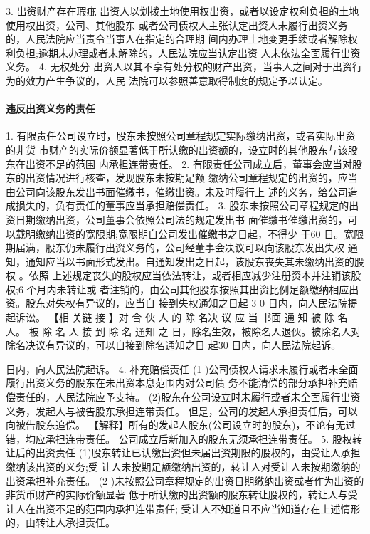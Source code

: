 \documentclass[UTF8,12pt]{ctexart}
\numberwithin{equation}{section} %
\numberwithin{figure}{section}
\numberwithin{table}{section}
\begin{document}
	3. 出资财产存在瑕疵 出资人以划拨土地使用权出资，或者以设定权利负担的土地使用权出资，公司、其他股东 或者公司债权人主张认定出资人未履行出资义务的，人民法院应当责令当事人在指定的合理期 间内办理土地变更手续或者解除权利负担;逾期未办理或者未解除的，人民法院应当认定出资 人未依法全面履行出资义务。
	4. 无权处分 出资人以其不享有处分权的财产出资，当事人之间对于出资行为的效力产生争议的，人民 法院可以参照善意取得制度的规定予以认定。
	
	\paragraph{违反出资义务的责任}
	1. 有限责任公司设立时，股东未按照公司章程规定实际缴纳出资，或者实际出资的非货 市财产的实际价额显著低于所认缴的出资额的，设立时的其他股东与该股东在出资不足的范围 内承担连带责任。
	2. 有限责任公司成立后，董事会应当对股东的出资情况进行核查，发现股东未按期足额 缴纳公司章程规定的出资的，应当由公司向该股东发出书面催缴书，催缴出资。未及时履行上 述的义务，给公司造成损失的，负有责任的董事应当承担赔偿责任。
	3. 股东未按照公司章程规定的出资日期缴纳出资，公司董事会依照公司法的规定发出书 面催缴书催缴出资的，可以载明缴纳出资的宽限期;宽限期自公司发出催缴书之日起，不得少 于60 日。宽限期届满，股东仍未履行出资义务的，公司经董事会决议可以向该股东发出失权 通知，通知应当以书面形式发出。自通知发出之日起，该股东丧失其未缴纳出资的股权 。依照 上述规定丧失的股权应当依法转让，或者相应减少注册资本并注销该股权;6 个月内未转让或 者注销的，由公司其他股东按照其出资比例足额缴纳相应出资。股东对失权有异议的，应当自 接到失权通知之日起 3 0 日内，向人民法院提起诉讼。
	【相 关链 接 】对 合 伙 人 的 除 名决 议 应 当 书面 通 知 被 除 名 人。 被 除 名 人 接 到 除 名 通知 之 日，除名生效，被除名人退伙。被除名人对除名决议有异议的，可以自接到除名通知之日 起30 日内，向人民法院起诉。
	
	
	
	 日内，向人民法院起诉。
	4. 补充赔偿责任
	(1 )公司债权人请求未履行或者未全面履行出资义务的股东在未出资本息范围内对公司债 务不能清偿的部分承担补充赔偿责任的，人民法院应予支持。 (2)股东在公司设立时未履行或者未全面履行出资义务，发起人与被告股东承担连带责任。 但是，公司的发起人承担责任后，可以向被告股东追偿。
	【解释】所有的发起人股东(公司设立时的股东)，不论有无过错，均应承担连带责任。 公司成立后新加入的股东无须承担连带责任。
	5. 股权转让后的出资责任
	(1)股东转让已认缴出资但未届出资期限的股权的，由受让人承担缴纳该出资的义务;受 让人未按期足额缴纳出资的，转让人对受让人未按期缴纳的出资承担补充责任。
	(2 )未按照公司章程规定的出资日期缴纳出资或者作为出资的非货币财产的实际价额显著 低于所认缴的出资额的股东转让股权的，转让人与受让人在出资不足的范围内承担连带责任; 受让人不知道且不应当知道存在上述情形的，由转让人承担责任。
	
\end{document}
